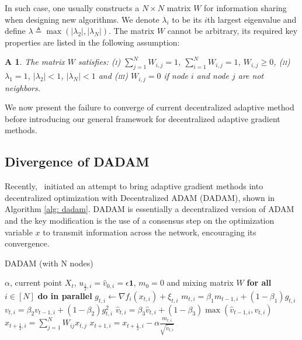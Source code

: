\documentclass[11pt]{article}
\newtheorem{assumptionA}{A\!\!}
\begin{document}
In such case, one usually constructs a $N \times N$ matrix $W$ for information sharing when designing new algorithms. 
We denote $\lambda_i$ to be its $i$th largest eigenvalue and define $\lambda \triangleq \max (|\lambda_2|,|\lambda_N|)$.
The matrix $W$ cannot be arbitrary, its required key properties are listed in the following assumption:
\begin{assumptionA}\label{a:matrixW}
The matrix $W$ satisfies: \textsc{(i)} $\sum_{j=1}^N W_{i,j} = 1$,  $\sum_{i=1}^N W_{i,j} = 1$, $W_{i,j} \geq 0$, \textsc{(ii)} $\lambda_1 = 1$, $|\lambda_2| < 1$, $|\lambda_N| < 1 $ and \textsc{(iii)} $W_{i,j} = 0 $ if node $i$ and node $j$ are not neighbors.
\end{assumptionA}
 We now present the failure to converge of current decentralized adaptive method before introducing our general framework for decentralized adaptive gradient methods.


\subsection{Divergence of DADAM}\label{sec:divergence}





Recently,~\citet{nazari2019dadam} initiated an attempt to bring adaptive gradient methods into decentralized optimization with Decentralized ADAM (DADAM), shown in Algorithm \ref{alg: dadam}.
DADAM is essentially a decentralized version of ADAM and the key modification is the use of a consensus step on the optimization variable $x$ to transmit information across the network, encouraging its convergence. 
\begin{algorithm}[H]
	\caption{DADAM (with N nodes)}
	\label{alg: dadam}
	\begin{algorithmic}[1]
		 $\alpha$, current point $X_t$, $u_{\frac{1}{2},i} = \hat v_{0,i} = \epsilon \mathbf{1}$, $m_0=0$ and mixing matrix $W$
		\STATE \textbf{for all }$i \in [N]$ \textbf{do in parallel}
		\STATE \quad $g_{t,i}  \leftarrow \nabla f_i(x_{t,i}) + \xi_{t,i}$
		\STATE \quad $m_{t,i} = \beta_1 m_{t-1,i} + (1-\beta_1) g_{t,i}$ 
		\STATE \quad $v_{t,i} = \beta_2 v_{t-1,i}+(1-\beta_2)g_{t,i}^2$
		\STATE \quad $\hat v_{t,i} = \beta_3 \hat v_{t,i} + (1-\beta_3) \max(\hat v_{t-1,i},v_{t,i})$
		\STATE \quad $x_{t+\frac{1}{2},i} = \sum_{j=1}^N W_{ij}x_{t,j}$
		\STATE \quad $x_{t+1,i} = x_{t+\frac{1}{2},i} - \alpha \frac{m_{t,i}}{\sqrt{\hat v_{t,i}}}$
		\ENDFOR
	\end{algorithmic}
\end{algorithm}
\end{document}

